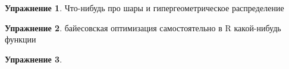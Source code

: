 \documentclass[12pt, a4paper, oneside]{extreport}
\theoremstyle{plain}              %
\theoremstyle{definition}         %
\newtheorem{problem}{\color{myblue} Упражнение}
\begin{document}
\begin{problem}
	Что-нибудь про шары и гипергеометрическое распределение 
	\begin{sol} 
		
	\end{sol} 
\end{problem}


\begin{problem}
	байесовская оптимизация самостоятельно в R какой-нибудь функции 
	\begin{sol} 
		
	\end{sol} 
\end{problem}


 \begin{problem}
 	
 	\begin{sol} 
 		
 	\end{sol} 
 \end{problem}


% 
\end{document}
